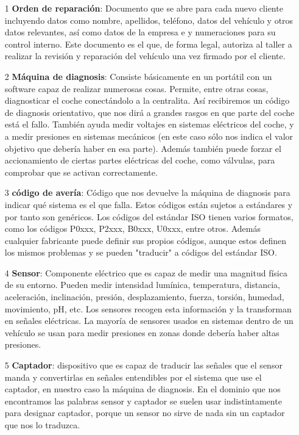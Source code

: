 \documentclass[a4paper,12pt]{article}
\begin{document}
\begin{itemize}
\item[1] \textbf{Orden de reparación}: Documento que se abre para cada nuevo cliente incluyendo datos como nombre, apellidos, teléfono, datos del vehículo y otros datos relevantes, así como datos de la empresa e y numeraciones para su control interno. Este documento es el que, de forma legal, autoriza al taller a realizar la revisión y reparación del vehículo una vez firmado por el cliente.
\item[2] \textbf{Máquina de diagnosis}: Consiste básicamente en un portátil con un software capaz de realizar numerosas cosas. Permite, entre otras cosas, diagnosticar el coche conectándolo a la centralita. Así recibiremos un código de diagnosis orientativo, que nos dirá a grandes rasgos en que parte del coche está el fallo. También ayuda medir voltajes en sistemas eléctricos del coche, y a medir presiones en sistemas mecánicos (en este caso sólo nos indica el valor objetivo que debería haber en esa parte). Además también puede forzar el accionamiento de ciertas partes eléctricas del coche, como válvulas, para comprobar que se activan correctamente.
\item[3] \textbf{código de avería}: Código que nos devuelve la máquina de diagnosis para indicar qué sistema es el que falla. Estos códigos están sujetos a estándares y por tanto son genéricos. Los códigos del estándar ISO tienen varios formatos, como los códigos P0xxx, P2xxx, B0xxx, U0xxx, entre otros. Además cualquier fabricante puede definir sus propios códigos, aunque estos definen los mismos problemas y se pueden "traducir" a códigos del estándar ISO.
\item[4] \textbf{Sensor}: Componente eléctrico que es capaz de medir una magnitud física de su entorno. Pueden medir intensidad lumínica, temperatura, distancia, aceleración, inclinación, presión, desplazamiento, fuerza, torsión, humedad, movimiento, pH, etc. Los sensores recogen esta información y la transforman en señales eléctricas. La mayoría de sensores usados en sistemas dentro de un vehículo se usan para medir presiones en zonas donde debería haber altas presiones.
\item[5] \textbf{Captador}: dispositivo que es capaz de traducir las señales que el sensor manda y convertirlas en señales entendibles por el sistema que use el captador, en nuestro caso la máquina de diagnosis. En el dominio que nos encontramos las palabras sensor y captador se suelen usar indistintamente para designar captador, porque un sensor no sirve de nada sin un captador que nos lo traduzca.

\end{itemize}
\end{document}
